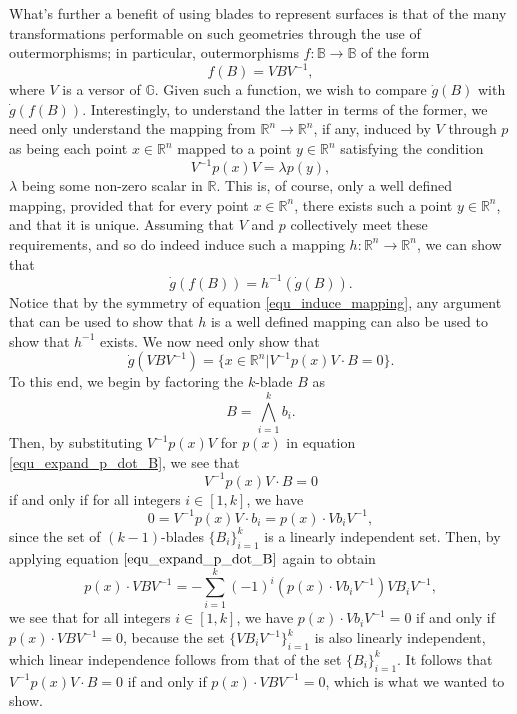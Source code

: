 \documentclass{ecgd-l}
\theoremstyle{definition}
\theoremstyle{remark}
\numberwithin{equation}{section}
\newcommand{\R}{\mathbb{R}}
\newcommand{\B}{\mathbb{B}}
\newcommand{\G}{\mathbb{G}}
\newcommand{\gd}{\dot{g}}
\begin{document}
What's further a benefit of using blades to represent surfaces is that of the many transformations
performable on such geometries through the use of outermorphisms; in particular,
outermorphisms $f:\B\to\B$ of the form
\begin{equation*}
f(B) = VBV^{-1},
\end{equation*}
where $V$ is a versor of $\G$.  Given such a function, we wish to
compare $\gd(B)$ with $\gd(f(B))$.  Interestingly, to understand
the latter in terms of the former, we need only understand the mapping from $\R^n\to\R^n$,
if any, induced by $V$ through $p$ as being each point $x\in\R^n$ mapped to a point
$y\in\R^n$ satisfying the condition
\begin{equation}\label{equ_induce_mapping}
V^{-1}p(x)V=\lambda p(y),
\end{equation}
$\lambda$ being some non-zero scalar in $\R$.
This is, of course, only a well defined mapping, provided that for every point $x\in\R^n$, there exists
such a point $y\in\R^n$, and that it is unique.
Assuming that $V$ and $p$ collectively meet these requirements, and so do indeed induce
such a mapping $h:\R^n\to\R^n$, we can show that
\begin{equation*}
\gd(f(B)) = h^{-1}(\gd(B)).
\end{equation*}
Notice that by the symmetry
of equation \eqref{equ_induce_mapping}, any argument that can be
used to show that $h$ is a well defined
mapping can also be used to show that $h^{-1}$ exists.
We now need only show that
\begin{equation*}
\gd(VBV^{-1})=\{x\in\R^n|V^{-1}p(x)V\cdot B=0\}.
\end{equation*}
To this end, we begin by factoring the $k$-blade $B$ as
\begin{equation*}
B = \bigwedge_{i=1}^k b_i.
\end{equation*}
Then, by substituting $V^{-1}p(x)V$ for $p(x)$ in equation \eqref{equ_expand_p_dot_B},
we see that
\begin{equation*}
V^{-1}p(x)V\cdot B=0
\end{equation*}
if and only if for all integers $i\in[1,k]$, we have
\begin{equation*}
0=V^{-1}p(x)V\cdot b_i=p(x)\cdot Vb_iV^{-1},
\end{equation*}
since the set of $(k-1)$-blades $\{B_i\}_{i=1}^k$ is a linearly
independent set.  Then, by applying equation $\eqref{equ_expand_p_dot_B}$ again
to obtain
\begin{equation*}
p(x)\cdot VBV^{-1} = -\sum_{i=1}^k(-1)^i(p(x)\cdot Vb_iV^{-1})VB_iV^{-1},
\end{equation*}
we see that
for all integers $i\in[1,k]$, we have $p(x)\cdot Vb_iV^{-1}=0$
if and only if $p(x)\cdot VBV^{-1}=0$, because the set $\{VB_iV^{-1}\}_{i=1}^k$ is
also linearly independent, which linear independence follows from that of the
set $\{B_i\}_{i=1}^k$.
It follows that $V^{-1}p(x)V\cdot B=0$ if and only if $p(x)\cdot VBV^{-1}=0$,
which is what we wanted to show.
\end{document}
